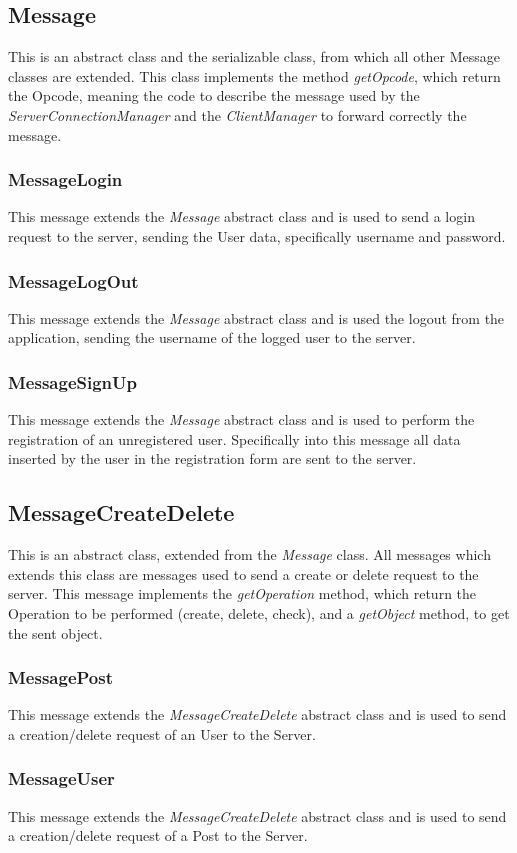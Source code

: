 \documentclass[11pt]{report}
\begin{document}
\subsection{Message}
This is an abstract class and the serializable class, from which all other Message classes are extended. This class implements the method \textit{getOpcode}, which return the Opcode, meaning the code to describe the message used by the \textit{ServerConnectionManager} and the \textit{ClientManager} to forward correctly the message.
\subsubsection{MessageLogin}
This message extends the \textit{Message} abstract class and is used to send a login request to the server, sending the User data, specifically username and password.
\subsubsection{MessageLogOut}
This message extends the \textit{Message} abstract class and is used the logout from the application, sending the username of the logged user to the server.
\subsubsection{MessageSignUp}
This message extends the \textit{Message} abstract class and is used to perform the registration of an unregistered user. Specifically into this message all data inserted by the user in the registration form are sent to the server.
\newpage
\subsection{MessageCreateDelete}
This is an abstract class, extended from the \textit{Message} class. All messages which extends this class are messages used to send a create or delete request to the server. This message implements the \textit{getOperation} method, which return the Operation to be performed (create, delete, check), and a \textit{getObject} method, to get the sent object.
\subsubsection{MessagePost}
This message extends the \textit{MessageCreateDelete} abstract class and is used to send a creation/delete request of an User to the Server.
\subsubsection{MessageUser}
This message extends the \textit{MessageCreateDelete} abstract class and is used to send a creation/delete request of a Post to the Server.
\end{document}
